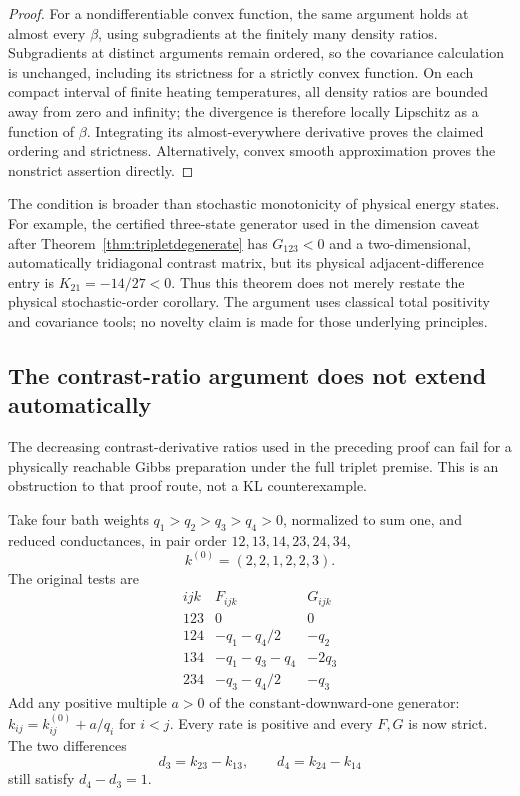 \documentclass[11pt]{article}
\begin{document}
\begin{proof}
For a nondifferentiable convex function, the same argument holds at
almost every $\beta$, using subgradients at the finitely many density
ratios. Subgradients at distinct arguments remain ordered, so the
covariance calculation is unchanged, including its strictness for a
strictly convex function. On each compact interval of finite heating
temperatures, all density ratios are bounded away from zero and infinity;
the divergence is therefore locally Lipschitz as a function of $\beta$.
Integrating its almost-everywhere derivative proves the claimed ordering
and strictness. Alternatively, convex smooth approximation proves the
nonstrict assertion directly.
\end{proof}

The condition is broader than stochastic monotonicity of physical
energy states. For example, the certified three-state generator used
in the dimension caveat after Theorem~\ref{thm:tripletdegenerate} has
$G_{123}<0$ and a two-dimensional, automatically tridiagonal contrast
matrix, but its physical adjacent-difference entry is
$K_{21}=-14/27<0$. Thus this theorem does not merely restate the
physical stochastic-order corollary. The argument uses classical total
positivity and covariance tools; no novelty claim is made for those
underlying principles.

\subsection{The contrast-ratio argument does not extend automatically}
\label{sec:thermalratioobstruction}
The decreasing contrast-derivative ratios used in the preceding proof
can fail for a physically reachable Gibbs preparation under the full
triplet premise. This is an obstruction to that proof route, not a KL
counterexample.

Take four bath weights $q_1>q_2>q_3>q_4>0$, normalized to sum one, and
reduced conductances, in pair order $12,13,14,23,24,34$,
\[
k^{(0)}=(2,2,1,2,2,3).
\]
The original tests are
\[
\begin{array}{c|cc}
ijk&F_{ijk}&G_{ijk}\\ \hline
123&0&0\\
124&-q_1-q_4/2&-q_2\\
134&-q_1-q_3-q_4&-2q_3\\
234&-q_3-q_4/2&-q_3
\end{array}
\]
Add any positive multiple $a>0$ of the constant-downward-one generator:
$k_{ij}=k^{(0)}_{ij}+a/q_i$ for $i<j$. Every rate is positive and every
$F,G$ is now strict. The two differences
\[
d_3=k_{23}-k_{13},\qquad d_4=k_{24}-k_{14}
\]
still satisfy $d_4-d_3=1$.
\end{document}

